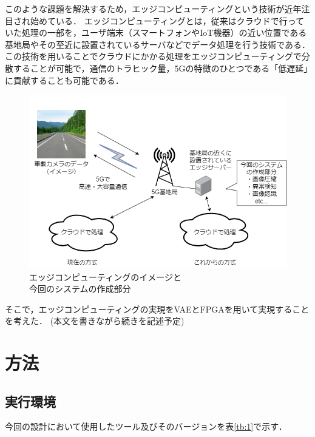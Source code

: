 \documentclass[paper]{ieicej}
\begin{document}
このような課題を解決するため，エッジコンピューティングという技術が近年注目され始めている．
エッジコンピューティングとは，従来はクラウドで行っていた処理の一部を，ユーザ端末（スマートフォンやIoT機器）の近い位置である基地局やその至近に設置されているサーバなどでデータ処理を行う技術である\cite{edge-com}．
この技術を用いることでクラウドにかかる処理をエッジコンピューティングで分散することが可能で，通信のトラヒック量，5Gの特徴のひとつである「低遅延」に貢献することも可能である．

\begin{figure}[tb]
  \begin{center}
    \includegraphics[width=0.98\columnwidth]{figures/Intr_1.png}
  \end{center}
  \caption{エッジコンピューティングのイメージと\\今回のシステムの作成部分}
  \label{fig:1-1}
\end{figure}

そこで，エッジコンピューティングの実現をVAEとFPGAを用いて実現することを考えた．
(本文を書きながら続きを記述予定)

\section{方法}
\subsection{実行環境}
今回の設計において使用したツール及びそのバージョンを表\ref{tb:1}で示す．
\end{document}
